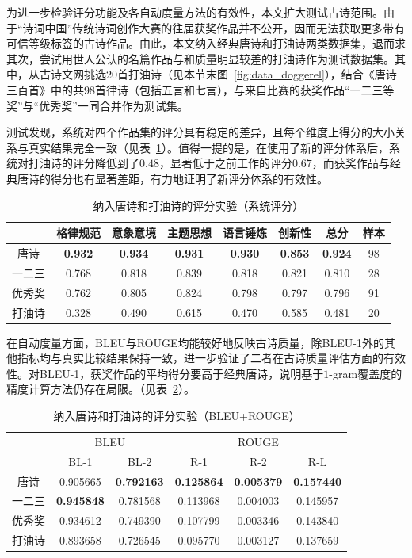 为进一步检验评分功能及各自动度量方法的有效性，本文扩大测试古诗范围。由于“诗词中国”传统诗词创作大赛的往届获奖作品并不公开，因而无法获取更多带有可信等级标签的古诗作品。由此，本文纳入经典唐诗和打油诗两类数据集，退而求其次，尝试用世人公认的名篇作品与和质量明显较差的打油诗作为测试数据集。其中，从古诗文网挑选20首打油诗（见本节末图~\ref{fig:data_doggerel}），结合《唐诗三百首》中的共98首律诗（包括五言和七言），与来自比赛的获奖作品“一二三等奖”与“优秀奖”一同合并作为测试集。

测试发现，系统对四个作品集的评分具有稳定的差异，且每个维度上得分的大小关系与真实结果完全一致（见表~\ref{tab:test_scoring_all_dsr1_detail}）。值得一提的是，在使用了新的评分体系后，系统对打油诗的评分降低到了$0.48$，显著低于之前工作的评分$0.67$，而获奖作品与经典唐诗的得分也有显著差距，有力地证明了新评分体系的有效性。

\begin{table}[ht]
  \centering
  \caption{纳入唐诗和打油诗的评分实验（系统评分）}
  \label{tab:test_scoring_all_dsr1_detail}
  \begin{tabular}{cccccccc}
      \toprule
      &格律规范& 意象意境& 主题思想& 语言锤炼&创新性& 总分& 样本\\
      \midrule
      唐诗	&	\bf{0.932} 	&	\bf{0.934} 	&	\bf{0.931} 	&	\bf{0.930} 	&	\bf{0.853} 	&	\bf{0.924} 	&	98	\\
      一二三	&	0.768 	&	0.818 	&	0.839 	&	0.818 	&	0.821 	&	0.810 	&	28	\\
      优秀奖	&	0.762 	&	0.805 	&	0.824 	&	0.798 	&	0.797 	&	0.796 	&	91	\\
      打油诗	&	0.328 	&	0.490 	&	0.615 	&	0.470 	&	0.585 	&	0.481 	&	20	\\									
      \bottomrule
  \end{tabular}
\end{table}

在自动度量方面，BLEU与ROUGE均能较好地反映古诗质量，除BLEU-1外的其他指标均与真实比较结果保持一致，进一步验证了二者在古诗质量评估方面的有效性。对BLEU-1，获奖作品的平均得分要高于经典唐诗，说明基于$1$-gram覆盖度的精度计算方法仍存在局限。（见表~\ref{tab:test_scoring_all_dsr1_1}）。

\begin{table}[ht]
  \centering
  \caption{纳入唐诗和打油诗的评分实验（BLEU+ROUGE）}
  \label{tab:test_scoring_all_dsr1_1}
  \begin{tabular}{cccccc}
      \toprule
      &  \multicolumn{2}{c}{BLEU} & \multicolumn{3}{c}{ROUGE}\\
      \cmidrule(r){2-3} \cmidrule(l){4-6}
      & BL-1& BL-2& R-1& R-2& R-L\\
      \midrule
      唐诗	&	0.905665 	&	\bf{0.792163} 	&	\bf{0.125864} 	&	\bf{0.005379} 	&	\bf{0.157440} 	\\
      一二三	&	\bf{0.945848} 	&	0.781568 	&	0.113968 	&	0.004003 	&	0.145957 	\\
      优秀奖	&	0.934612 	&	0.749390 	&	0.107799 	&	0.003346 	&	0.143840 	\\
      打油诗	&	0.893658 	&	0.726545 	&	0.095770 	&	0.003127 	&	0.137659 	\\
      \bottomrule
  \end{tabular}
\end{table}

